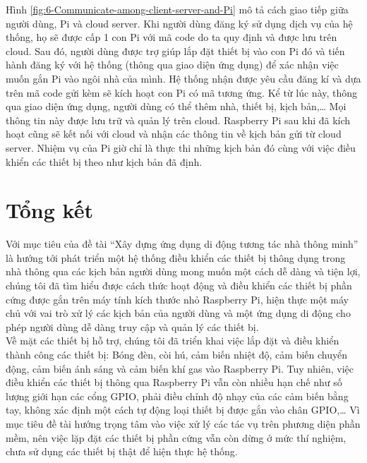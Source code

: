 \documentclass[12pt,a4paper,oneside]{extbook}
\begin{document}
\noindent
Hình \ref{fig:6-Communicate-among-client-server-and-Pi} mô tả cách giao tiếp giữa người dùng, Pi và cloud server. Khi người dùng đăng ký sử dụng dịch vụ của hệ thống, họ sẽ được cấp 1 con Pi với mã code do ta quy định và được lưu trên cloud. Sau đó, người dùng được trợ giúp lắp đặt thiết bị vào con Pi đó và tiến hành đăng ký với hệ thống (thông qua giao diện ứng dụng) để xác nhận việc muốn gắn Pi vào ngôi nhà của mình. Hệ thống nhận được yêu cầu đăng kí và dựa trên mã code gửi kèm sẽ kích hoạt con Pi có mã tương ứng. Kể từ lúc này, thông qua giao diện ứng dụng, người dùng có thể thêm nhà, thiết bị, kịch bản,\dots\hspace{0mm} Mọi thông tin này được lưu trữ và quản lý trên cloud. Raspberry Pi sau khi đã kích hoạt cũng sẽ kết nối với cloud và nhận các thông tin về kịch bản gửi từ cloud server. Nhiệm vụ của Pi giờ chỉ là thực thi những kịch bản đó cùng với việc điều khiển các thiết bị theo như kịch bản đã định.

\chapter{Tổng kết}

Với mục tiêu của đề tài “Xây dựng ứng dụng di động tương tác nhà thông minh” là hướng tới phát triển một hệ thống điều khiển các thiết bị thông dụng trong nhà thông qua các kịch bản người dùng mong muốn một cách dễ dàng và tiện lợi, chúng tôi đã tìm hiểu được cách thức hoạt động và điều khiển các thiết bị phần cứng được gắn trên máy tính kích thước nhỏ Raspberry Pi, hiện thực một máy chủ với vai trò xử lý các kịch bản của người dùng và một ứng dụng di động cho phép người dùng dễ dàng truy cập và quản lý các thiết bị.\\

\noindent
Về mặt các thiết bị hỗ trợ, chúng tôi đã triển khai việc lắp đặt và điều khiển thành công các thiết bị: Bóng đèn, còi hú, cảm biến nhiệt độ, cảm biến chuyển động, cảm biến ánh sáng và cảm biến khí gas vào Raspberry Pi. Tuy nhiên, việc điều khiển các thiết bị thông qua Raspberry Pi vẫn còn nhiều hạn chế như số lượng giới hạn các cổng GPIO, phải điều chỉnh độ nhạy của các cảm biến bằng tay, không xác định một cách tự động loại thiết bị được gắn vào chân GPIO,\dots\hspace{0mm} Vì mục tiêu đề tài hướng trọng tâm vào việc xử lý các tác vụ trên phương diện phần mềm, nên việc lặp đặt các thiết bị phần cứng vẫn còn dừng ở mức thí nghiệm, chưa sử dụng các thiết bị thật để hiện thực hệ thống.\\
\end{document}
